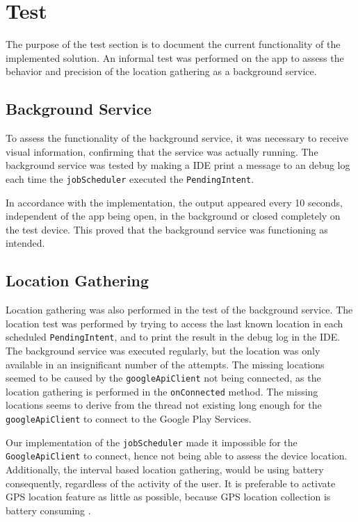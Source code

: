 \section{Test} \label{sec:s2test}
The purpose of the test section is to document the current functionality of the implemented solution.
An informal test was performed on the app to assess the behavior and precision of the location gathering as a background service.

\subsection{Background Service}
To assess the functionality of the background service, it was necessary to receive visual information, confirming that the service was actually running.
The background service was tested by making a IDE print a message to an debug log each time the \texttt{jobScheduler} executed the \texttt{PendingIntent}.

In accordance with the implementation, the output appeared every 10 seconds, independent of the app being open, in the background or closed completely on the test device.
This proved that the background service was functioning as intended.

\subsection{Location Gathering} 
Location gathering was also performed in the test of the background service.
The location test was performed by trying to access the last known location in each scheduled \texttt{PendingIntent}, and to print the result in the debug log in the IDE.
The background service was executed regularly, but the location was only available in an insignificant number of the attempts.
The missing locations seemed to be caused by the \texttt{googleApiClient} not being connected, as the location gathering is performed in the \texttt{onConnected} method.
The missing locations seems to derive from the thread not existing long enough for the \texttt{googleApiClient} to connect to the Google Play Services.

Our implementation of the \texttt{jobScheduler} made it impossible for the \texttt{GoogleApiClient} to connect, hence not being able to assess the device location.
Additionally, the interval based location gathering, would be using battery consequently, regardless of the activity of the user. 
It is preferable to activate GPS location feature as little as possible, because GPS location collection is battery consuming \citep{fuckGPS}.